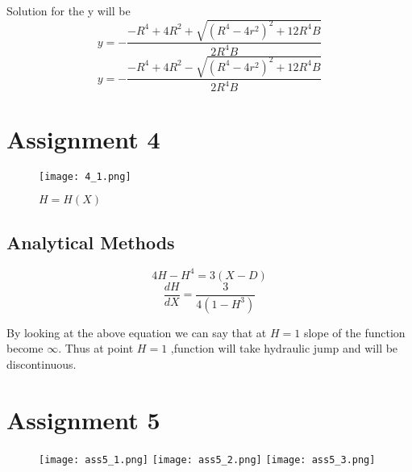 \documentclass{article}
\begin{document}
Solution for the y will be
$$y = - \frac{-R^4 + 4R^2 + \sqrt{(R^4 - 4r^2)^2 + 12R^4B}}{2R^4B}$$
$$y = - \frac{-R^4 + 4R^2 - \sqrt{(R^4 - 4r^2)^2 + 12R^4B}}{2R^4B}$$
\newpage

\section{Assignment 4}
\begin{figure}[!h]
    \centering
    \texttt{[image: 4\_1.png]}
    \caption{$H = H(X)$}
\end{figure}
\subsection{Analytical Methods}
$$4H - H^4 = 3(X - D)$$
$$\frac{dH}{dX} = \frac{3}{4(1 - H^3)}$$

By looking at the above equation we can say that at $H = 1$ slope of the function become $\infty$. Thus at point $H = 1$ ,function will take hydraulic jump and will be discontinuous.  
\newpage
\section{Assignment 5}

\begin{figure}[h!]
    \centering
    \texttt{[image: ass5\_1.png]}
    \texttt{[image: ass5\_2.png]}
    \texttt{[image: ass5\_3.png]}
\end{figure}
\end{document}
